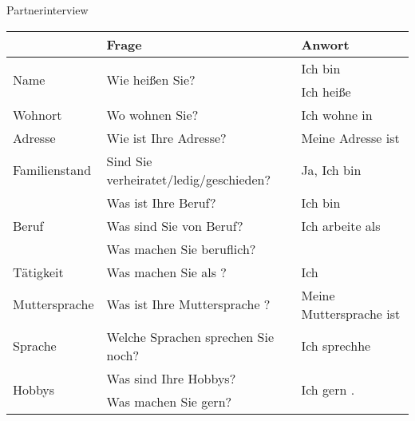 \begin{discourse}{Partnerinterview}{}
\begin{tabular}{|l|l|l|}
	\hline
	& Frage & Anwort \\
	\hline
	\multirow{2}{*}{Name} & \multirow{2}{*}{Wie heißen Sie?} & Ich bin \\
						  & & Ich heiße \\
	\hline
	Wohnort & Wo wohnen Sie? & Ich wohne in \fillhere \\
	\hline
	Adresse & Wie ist Ihre Adresse? & Meine Adresse ist \fillhere \\
	\hline
	Familienstand & Sind Sie verheiratet/ledig/geschieden? & Ja, Ich bin \fillhere \\
	\hline
	\multirow{3}{*}{Beruf} & Was ist Ihre Beruf? & Ich bin \fillhere \\
						   & Was sind Sie von Beruf? & Ich arbeite als \fillhere \\
						   & Was machen Sie beruflich? & \\
	\hline
	Tätigkeit & Was machen Sie als \fillhere ? & Ich \fillhere \\
	\hline
	Muttersprache & Was ist Ihre Muttersprache ? & Meine Muttersprache ist \fillhere \\
	\hline
	Sprache & Welche Sprachen sprechen Sie noch? & Ich sprechhe \fillhere \\
	\hline
	\multirow{2}{*}{Hobbys} & Was sind Ihre Hobbys? & \multirow{2}{*}{Ich \fillhere gern \fillhere .} \\
							& Was machen Sie gern? & \\
	\hline
\end{tabular}
\end{discourse}

